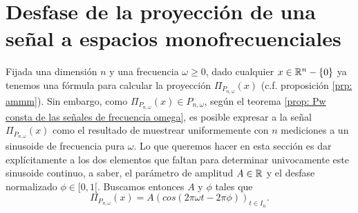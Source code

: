 \begin{comment}
\begin{nota}
Observe lo siguiente; fijadas una dimensión $n$
y una señal $x \in \IR^{n}$, si 
$\omega \in [0, \frac{n}{2}]$, entonces
\begin{equation}
\label{eq0: 1May}
\sigma_{n}(x, \omega) = \sigma_{n}(x, \omega + n/2).
\end{equation}

\noindent
En efecto, para toda $0 \leq m \leq n-1$,
por la regla del coseno de la suma de dos ángulos,
\[
cos\left(2 \pi \left( \omega + \frac{n}{2} \right) \frac{m}{n} \right)
= (-1)^{m} cos \left( 2 \pi \omega \frac{m}{n} \right)
\] 
y, similarmente, 
\[
sen \left(2 \pi \left( \omega + \frac{n}{2} \right) \frac{m}{n} \right)
= (-1)^{m} sen \left( 2 \pi \omega \frac{m}{n} \right),
\] 
luego, se tienen las igualdades \[
c_{n, \omega} =  2_{n, \omega + n/2}
\]
y \[
s_{n, \omega} = s_{n, \omega + n/2},
\] 
por lo tanto, 
\begin{align*}
P_{\omega + \frac{n}{1}} := & span(c_{n, \omega}, s_{n, \omega}) \\
= &  span(c_{n, \omega}, s_{n, \omega})
\end{align*}
\TODO{general al mismo P omega, por eso los sigmas son iguales.}
\end{nota}
\end{comment}

\section{Desfase de la proyección de una señal a espacios monofrecuenciales}


Fijada una dimensión $n$ y 
una frecuencia $\omega \geq 0$,
dado cualquier 
$x \in \mathbb{R}^{n}-\{ 0 \}$
ya tenemos una fórmula para calcular la
proyección $\Pi_{P_{n, \omega}}(x)$ 
(c.f. proposición \ref{prp: ammm}).
Sin embargo, 
como
$\Pi_{P_{n, \omega}}(x) \in P_{n, \omega}$, 
según el teorema 
\ref{prop: Pw consta de las señales de frecuencia omega}, 
es posible expresar a la señal $\Pi_{P_{n, \omega}}(x)$
como el resultado de muestrear uniformemente con $n$ mediciones
a un sinusoide de frecuencia pura $\omega$. Lo que queremos hacer
en esta sección es dar explícitamente a los dos elementos que
faltan para determinar univocamente este sinusoide continuo,
a saber, el parámetro de amplitud $A \in \mathbb{R}$ y el 
desfase normalizado $\phi \in [0,1[$. Buscamos entonces $A$
y $\phi$ tales que
\[
\Pi_{P_{n, \omega}}(x) = A (cos(2 \pi \omega t -  2 \pi \phi ))_{t \in I_{n}}.
\]
 

